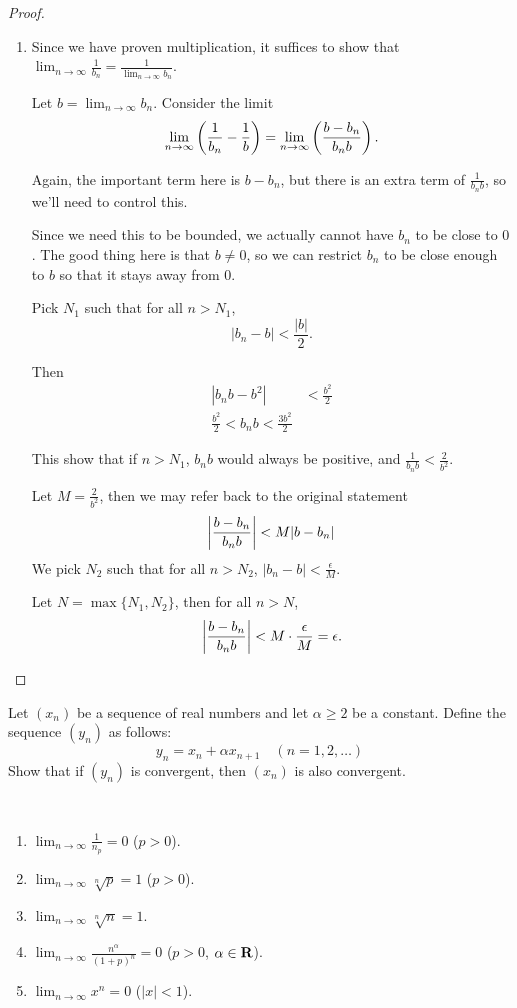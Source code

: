 \begin{proof}
\begin{enumerate}[label=(\arabic*)]
\item Since we have proven multiplication, it suffices to show that $\displaystyle\lim_{n\to\infty}\frac{1}{b_n}=\frac{1}{\lim_{n\to\infty} b_n}$.

Let $\displaystyle b=\lim_{n\to\infty} b_n$. Consider the limit
\[ \lim_{n\to\infty}\left(\frac{1}{b_n}-\frac{1}{b}\right)=\lim_{n\to\infty}\left(\frac{b-b_n}{b_nb}\right). \]

Again, the important term here is $b-b_n$, but there is an extra term of $\frac{1}{b_nb}$, so we'll need to control this.

Since we need this to be bounded, we actually cannot have $b_n$ to be close to $0$. The good thing here is that $b\neq0$, so we can restrict $b_n$ to be close enough to $b$ so that it stays away from $0$.

Pick $N_1$ such that for all $n>N_1$,
\[|b_n-b|<\frac{|b|}{2}.\]

Then
\begin{align*}
|b_nb-b^2|&<\frac{b^2}{2}\\
\frac{b^2}{2}<b_nb<\frac{3b^2}{2}
\end{align*}

This show that if $n>N_1$, $b_nb$ would always be positive, and $\frac{1}{b_nb}<\frac{2}{b^2}$.

Let $M=\frac{2}{b^2}$, then we may refer back to the original statement
\[ \left|\frac{b-b_n}{b_nb}\right|<M|b-b_n| \]
We pick $N_2$ such that for all $n>N_2$, $|b_n-b|<\frac{\epsilon}{M}$.

Let $N=\max\{N_1,N_2\}$, then for all $n>N$,
\[ \left|\frac{b-b_n}{b_nb}\right|<M\cdot\frac{\epsilon}{M}=\epsilon. \]
\end{enumerate}
\end{proof}

\begin{exercise}
Let $(x_n)$ be a sequence of real numbers and let $\alpha\ge2$ be a constant. Define the sequence $(y_n)$ as follows:
\[y_n=x_n+\alpha x_{n+1}\quad(n=1,2,\dots)\]
Show that if $(y_n)$ is convergent, then $(x_n)$ is also convergent.
\end{exercise}

\begin{exercise} \
\begin{enumerate}[label=(\arabic*)]
\item $\displaystyle\lim_{n\to\infty}\frac{1}{n_p}=0$ ($p>0$).
\item $\displaystyle\lim_{n\to\infty}\sqrt[n]{p}=1$ ($p>0$).
\item $\displaystyle\lim_{n\to\infty}\sqrt[n]{n}=1$.
\item $\displaystyle\lim_{n\to\infty}\frac{n^\alpha}{(1+p)^n}=0$ ($p>0$, $\alpha\in\mathbf R$).
\item $\displaystyle\lim_{n\to\infty}x^n=0$ ($|x|<1$).
\end{enumerate}
\end{exercise}

